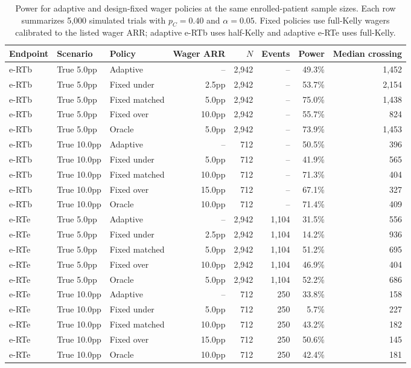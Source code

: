 \begin{table}[htbp]
\centering
\caption{Power for adaptive and design-fixed wager policies at the same enrolled-patient sample sizes. Each row summarizes 5{,}000 simulated trials with $p_C = 0.40$ and $\alpha = 0.05$. Fixed policies use full-Kelly wagers calibrated to the listed wager ARR; adaptive e-RTb uses half-Kelly and adaptive e-RTe uses full-Kelly.}
\label{tab:wager_policy_v8}
\begin{tabular}{@{}lllrrrrr@{}}
\toprule
Endpoint & Scenario & Policy & Wager ARR & $N$ & Events & Power & Median crossing \\
\midrule
e-RTb & True 5.0pp & Adaptive & -- & 2{,}942 & -- & 49.3\% & 1{,}452 \\
e-RTb & True 5.0pp & Fixed under & 2.5pp & 2{,}942 & -- & 53.7\% & 2{,}154 \\
e-RTb & True 5.0pp & Fixed matched & 5.0pp & 2{,}942 & -- & 75.0\% & 1{,}438 \\
e-RTb & True 5.0pp & Fixed over & 10.0pp & 2{,}942 & -- & 55.7\% & 824 \\
e-RTb & True 5.0pp & Oracle & 5.0pp & 2{,}942 & -- & 73.9\% & 1{,}453 \\
e-RTb & True 10.0pp & Adaptive & -- & 712 & -- & 50.5\% & 396 \\
e-RTb & True 10.0pp & Fixed under & 5.0pp & 712 & -- & 41.9\% & 565 \\
e-RTb & True 10.0pp & Fixed matched & 10.0pp & 712 & -- & 71.3\% & 404 \\
e-RTb & True 10.0pp & Fixed over & 15.0pp & 712 & -- & 67.1\% & 327 \\
e-RTb & True 10.0pp & Oracle & 10.0pp & 712 & -- & 71.4\% & 409 \\
e-RTe & True 5.0pp & Adaptive & -- & 2{,}942 & 1{,}104 & 31.5\% & 556 \\
e-RTe & True 5.0pp & Fixed under & 2.5pp & 2{,}942 & 1{,}104 & 14.2\% & 936 \\
e-RTe & True 5.0pp & Fixed matched & 5.0pp & 2{,}942 & 1{,}104 & 51.2\% & 695 \\
e-RTe & True 5.0pp & Fixed over & 10.0pp & 2{,}942 & 1{,}104 & 46.9\% & 404 \\
e-RTe & True 5.0pp & Oracle & 5.0pp & 2{,}942 & 1{,}104 & 52.2\% & 686 \\
e-RTe & True 10.0pp & Adaptive & -- & 712 & 250 & 33.8\% & 158 \\
e-RTe & True 10.0pp & Fixed under & 5.0pp & 712 & 250 & 5.7\% & 227 \\
e-RTe & True 10.0pp & Fixed matched & 10.0pp & 712 & 250 & 43.2\% & 182 \\
e-RTe & True 10.0pp & Fixed over & 15.0pp & 712 & 250 & 50.6\% & 145 \\
e-RTe & True 10.0pp & Oracle & 10.0pp & 712 & 250 & 42.4\% & 181 \\
\bottomrule
\end{tabular}
\end{table}
